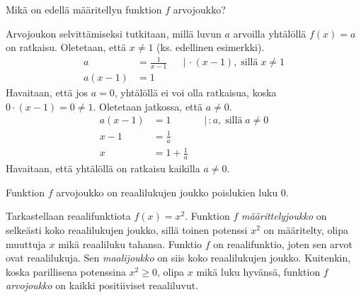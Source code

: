 \begin{esimerkki}
	Mikä on edellä määritellyn funktion $f$ arvojoukko?
	\begin{esimratk}
		Arvojoukon selvittämiseksi tutkitaan, millä luvun $a$ arvoilla
		yhtälöllä $f(x) = a$ on ratkaisu. Oletetaan, että $x \neq 1$ (ks. edellinen esimerkki).
		\begin{align*}
			a &= \frac{1}{x-1} & &| \, \cdot (x-1), \; \text{sillä} \; x \neq 1 \\
			a(x-1) &= 1
		\end{align*}
		Havaitaan, että jos $a = 0$, yhtälöllä ei voi olla ratkaisua, koska $0 \cdot (x-1) = 0 \neq 1$.
		Oletetaan jatkossa, että $a \neq 0$.
		\begin{align*}
			a(x-1) &= 1 & &| \, : a, \; \text{sillä} \; a \neq 0 \\
			x-1 &= \frac{1}{a} \\
			x &= 1+\frac{1}{a}
		\end{align*}
		Havaitaan, että yhtälöllä on ratkaisu kaikilla $a \neq 0$.
	\end{esimratk}
	\begin{esimvast}
		Funktion $f$ arvojoukko on reaalilukujen joukko poislukien luku $0$.
	\end{esimvast}
\end{esimerkki}

\begin{esimerkki}
	Tarkastellaan reaalifunktiota $f(x)=x^2$. Funktion $f$ \textit{määrittelyjoukko} on selkeästi koko reaalilukujen joukko, sillä toinen potenssi $x^2$ 
	on määritelty, olipa muuttuja $x$ mikä reaaliluku tahansa. Funktio $f$ on reaalifunktio, joten sen arvot ovat reaalilukuja. Sen \textit{maalijoukko} on siis 
	koko reaalilukujen joukko. Kuitenkin, koska parillisena potenssina $x^{2}\geq0$, olipa $x$ mikä luku hyvänsä, funktion $f$ \textit{arvojoukko} on kaikki 
	positiiviset reaaliluvut.
	
	\begin{center}
		\begin{kuvaajapohja}{0.7}{-5}{5}{-2}{8}
		\end{kuvaajapohja}
	\end{center}

	
\end{esimerkki}

